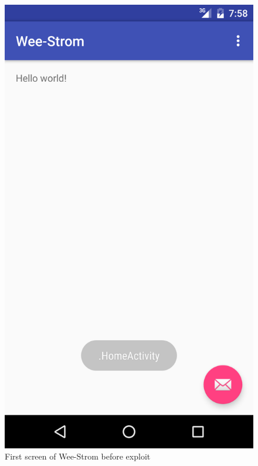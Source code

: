 \documentclass[conference,compsoc]{IEEEtran}
\begin{document}
\begin{figure}
\includegraphics[width=\columnwidth]{strom.png}
\caption{First screen of Wee-Strom before exploit}
\label{Screenshot:WSBefore}
\end{figure}
\end{document}
